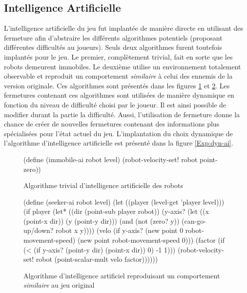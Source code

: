 \documentclass[12pt,twoside,letterpaper,francais]{book}
\begin{document}
\FloatBarrier
\subsection{Intelligence Artificielle}
L'intelligence artificielle du jeu fut implantée de manière directe en
utilisant des fermeture afin d'abstraire les différents algorithmes
potentiels (proposant différentes difficultés au joueurs). Seuls deux
algorithmes furent toutefois implantés pour le jeu. Le premier,
complètement trivial, fait en sorte que les robots demeurent
immobiles.  Le deuxième utilise un environnement totalement observable
et reproduit un comportement \emph{similaire} à celui des ennemis de
la version originale. Ces algorithmes sont présentés dans les figures
\ref{Exp:ai-imm} et \ref{Exp:ai-seek}. Les fermetures contenant ces
algorithmes sont utilisées de manière dynamique en fonction du niveau
de difficulté choisi par le joueur. Il est ainsi possible de modifier
durant la partie la difficulté. Aussi, l'utilisation de fermeture
donne la chance de créer de nouvelles fermetures contenant des
informations plus spécialisées pour l'état actuel du
jeu. L'implantation du choix dynamique de l'algorithme d'intelligence
artificielle est présenté dans la figure \ref{Exp:dyn-ai}.

\begin{figure}[htb!]
  \begin{schemecode}
(define (immobile-ai robot level)
  (robot-velocity-set! robot point-zero))
  \end{schemecode}
  \caption{Algorithme trivial d'intelligence artificielle des robots}
  \label{Exp:ai-imm}
\end{figure}

\begin{figure}[htb!]
  \begin{schemecode}
(define (seeker-ai robot level)
  (let ((player (level-get 'player level)))
    (if player
        (let* ((dir (point-sub player robot))
               (y-axis? (let ((x (point-x dir)) (y (point-y dir)))
                          (and (not (zero? y))
                               (can-go-up/down? robot x y))))
               (velo (if y-axis?
                         (new point 0 robot-movement-speed)
                         (new point robot-movement-speed 0)))
               (factor (if (< (if y-axis? (point-y dir) (point-x dir)) 0)
                           -1
                           1)))
          (robot-velocity-set! robot (point-scalar-mult velo factor))))))
  \end{schemecode}
  \caption{Algorithme d'intelligence artificiel reproduisant un
    comportement \emph{similaire} au jeu original}
  \label{Exp:ai-seek}
\end{figure}
\end{document}
